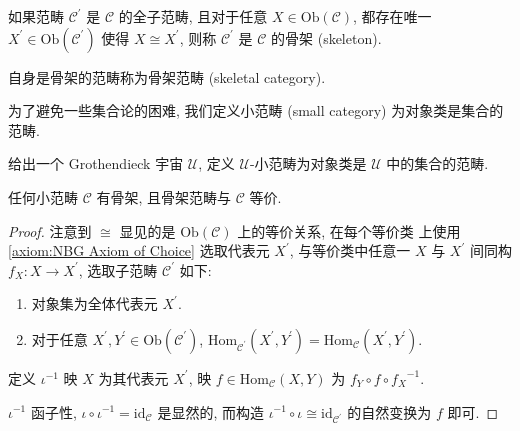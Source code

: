 \begin{definition}[骨架]
    如果范畴 \(\mathcal{C}^\prime\) 是 \(\mathcal{C}\) 的全子范畴, 且对于任意 \(X \in \mathrm{Ob} (\mathcal{C})\),
    都存在唯一 \(X^\prime \in \mathrm{Ob} (\mathcal{C}^\prime)\) 使得 \(X \cong X^\prime\), 则称 \(\mathcal{C}^\prime\) 是 \(\mathcal{C}\) 的骨架 (skeleton).

    自身是骨架的范畴称为骨架范畴 (skeletal category).
\end{definition}

\begin{definition}[小范畴]
    为了避免一些集合论的困难, 我们定义小范畴 (small category) 为对象类是集合的范畴.

    给出一个 Grothendieck 宇宙 \(\mathcal{U}\), 定义 \(\mathcal{U}\)-小范畴为对象类是 \(\mathcal{U}\) 中的集合的范畴.
\end{definition}

\begin{lemma}
    任何小范畴 \(\mathcal{C}\) 有骨架, 且骨架范畴与 \(\mathcal{C}\) 等价.

    \begin{proof}
        注意到 \(\cong\) 显见的是 \(\mathrm{Ob} (\mathcal{C})\) 上的等价关系, 在每个等价类
        上使用 \ref{axiom:NBG Axiom of Choice} 选取代表元 \(X^\prime\), 与等价类中任意一 \(X\) 与 \(X^\prime\) 间同构 \(f_X : X \to X^\prime\),
        选取子范畴 \(\mathcal{C}^\prime\) 如下:

        \begin{enumerate}
            \item 对象集为全体代表元 \(X^\prime\).
            \item 对于任意 \(X^\prime,Y^\prime \in \mathrm{Ob} (\mathcal{C}^\prime)\), \(\mathrm{Hom}_{\mathcal{C}^\prime} (X^\prime,Y^\prime) = \mathrm{Hom}_{\mathcal{C}} (X^\prime,Y^\prime) \).
        \end{enumerate}

        定义 \(\iota^{-1}\) 映 \(X\) 为其代表元 \(X^\prime\), 映 \(f \in \mathrm{Hom}_{\mathcal{C}} (X,Y)\) 为 
        \(f_Y \circ f \circ {f_X}^{-1}\).

        \(\iota^{-1}\) 函子性, \(\iota \circ \iota^{-1} = \mathrm{id}_{\mathcal{C}}\) 是显然的, 而构造 \(\iota^{-1} \circ \iota \cong \mathrm{id}_{\mathcal{C}^\prime}\) 的自然变换为 \(f\) 即可.
    \end{proof}
\end{lemma}

